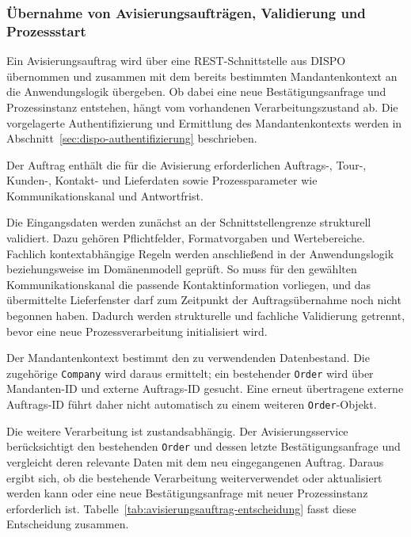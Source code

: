 \subsubsection{Übernahme von Avisierungsaufträgen, Validierung und Prozessstart}
\label{sec:auftragsuebernahme}

Ein Avisierungsauftrag wird über eine REST-Schnittstelle aus DISPO übernommen
und zusammen mit dem bereits bestimmten Mandantenkontext an die
Anwendungslogik übergeben. Ob dabei eine neue Bestätigungsanfrage und
Prozessinstanz entstehen, hängt vom vorhandenen Verarbeitungszustand ab. Die
vorgelagerte Authentifizierung und Ermittlung des Mandantenkontexts werden in
Abschnitt~\ref{sec:dispo-authentifizierung} beschrieben.

Der Auftrag enthält die für die Avisierung erforderlichen Auftrags-, Tour-,
Kunden-, Kontakt- und Lieferdaten sowie Prozessparameter wie
Kommunikationskanal und Antwortfrist.

Die Eingangsdaten werden zunächst an der Schnittstellengrenze strukturell
validiert. Dazu gehören Pflichtfelder, Formatvorgaben und Wertebereiche.
Fachlich kontextabhängige Regeln werden anschließend in der Anwendungslogik
beziehungsweise im Domänenmodell geprüft. So muss für den gewählten
Kommunikationskanal die passende Kontaktinformation vorliegen, und das
übermittelte Lieferfenster darf zum Zeitpunkt der Auftragsübernahme noch nicht
begonnen haben. Dadurch werden strukturelle und fachliche Validierung getrennt,
bevor eine neue Prozessverarbeitung initialisiert wird.

Der Mandantenkontext bestimmt den zu verwendenden Datenbestand. Die zugehörige
\texttt{Company} wird daraus ermittelt; ein bestehender \texttt{Order} wird
über Mandanten-ID und externe Auftrags-ID gesucht. Eine erneut übertragene
externe Auftrags-ID führt daher nicht automatisch zu einem weiteren
\texttt{Order}-Objekt.

Die weitere Verarbeitung ist zustandsabhängig. Der Avisierungsservice
berücksichtigt den bestehenden \texttt{Order} und dessen letzte
Bestätigungsanfrage und vergleicht deren relevante Daten mit dem neu
eingegangenen Auftrag. Daraus ergibt sich, ob die bestehende Verarbeitung
weiterverwendet oder aktualisiert werden kann oder eine neue
Bestätigungsanfrage mit neuer Prozessinstanz erforderlich ist.
Tabelle~\ref{tab:avisierungsauftrag-entscheidung} fasst diese Entscheidung
zusammen.

